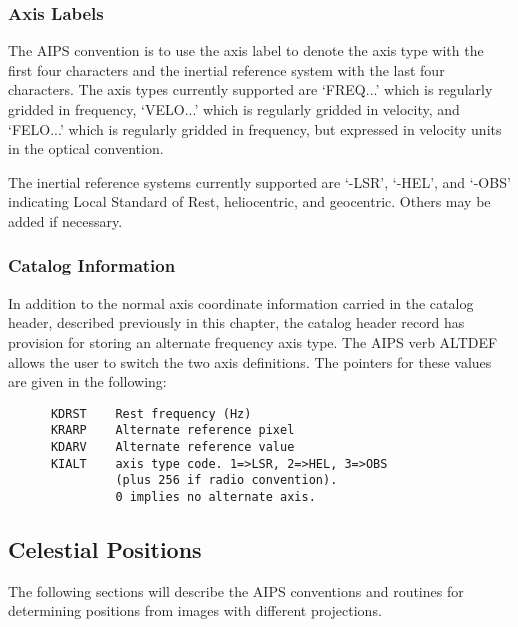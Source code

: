 \subsubsection{Axis Labels}
The AIPS convention is to use the axis label to denote the axis type
with the first four characters and the inertial reference system with
the last four characters.  The axis types currently supported are
`FREQ...' which is regularly gridded in frequency, `VELO...' which is
regularly gridded in velocity, and `FELO...' which is regularly
gridded in frequency, but expressed in velocity units in the optical
convention.

The inertial reference systems currently supported are `-LSR', `-HEL',
and `-OBS' indicating Local Standard of Rest, heliocentric, and
geocentric.  Others may be added if necessary.

\subsubsection{Catalog Information}
In addition to the normal axis coordinate information carried in the
catalog header, described previously in this chapter, the catalog
header record has provision for storing an alternate frequency axis
type.  The AIPS verb ALTDEF allows the user to switch the two axis
definitions.  The pointers for these values are given in the
following:

\begin{verbatim}
      KDRST    Rest frequency (Hz)
      KRARP    Alternate reference pixel
      KDARV    Alternate reference value
      KIALT    axis type code. 1=>LSR, 2=>HEL, 3=>OBS
               (plus 256 if radio convention).
               0 implies no alternate axis.

\end{verbatim}

\subsection{Celestial Positions}
The following sections will describe the AIPS conventions and routines
for determining positions from images with different projections.

